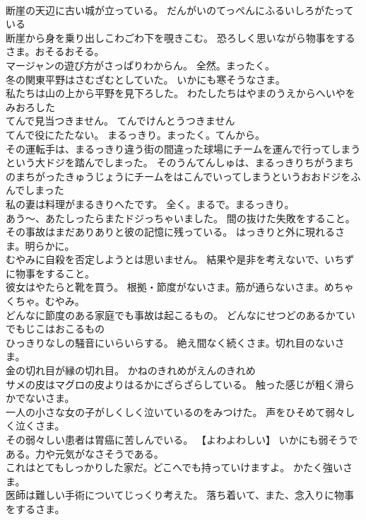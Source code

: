 \documentclass[8pt]{extreport}
\begin{document}
\begin{CJK}{UTF8}{min}
\\	断崖の天辺に古い城が立っている。	だんがいのてっぺんにふるいしろがたっている 
\\	断崖から身を乗り出しこわごわ下を覗きこむ。	恐ろしく思いながら物事をするさま。おそるおそる。
\\	マージャンの遊び方がさっぱりわからん。	全然。まったく。
\\	冬の関東平野はさむざむとしていた。	いかにも寒そうなさま。
\\	私たちは山の上から平野を見下ろした。	わたしたちはやまのうえからへいやをみおろした 
\\	てんで見当つきません。	てんでけんとうつきません 
\\	てんで役にたたない。	まるっきり。まったく。てんから。
\\	その運転手は、まるっきり違う街の間違った球場にチームを運んで行ってしまうという大ドジを踏んでしまった。	そのうんてんしゅは、まるっきりちがうまちのまちがったきゅうじょうにチームをはこんでいってしまうというおおドジをふんでしまった 
\\	私の妻は料理がまるきりへたです。	全く。まるで。まるっきり。
\\	あう～、あたしったらまたドジっちゃいました。	間の抜けた失敗をすること。
\\	その事故はまだありありと彼の記憶に残っている。	はっきりと外に現れるさま。明らかに。
\\	むやみに自殺を否定しようとは思いません。	結果や是非を考えないで、いちずに物事をすること。
\\	彼女はやたらと靴を買う。	根拠・節度がないさま。筋が通らないさま。めちゃくちゃ。むやみ。
\\	どんなに節度のある家庭でも事故は起こるもの。	どんなにせつどのあるかていでもじこはおこるもの 
\\	ひっきりなしの騒音にいらいらする。	絶え間なく続くさま。切れ目のないさま。
\\	金の切れ目が縁の切れ目。	かねのきれめがえんのきれめ 
\\	サメの皮はマグロの皮よりはるかにざらざらしている。	触った感じが粗く滑らかでないさま。
\\	一人の小さな女の子がしくしく泣いているのをみつけた。	声をひそめて弱々しく泣くさま。
\\	その弱々しい患者は胃癌に苦しんでいる。	【よわよわしい】 いかにも弱そうである。力や元気がなさそうである。
\\	これはとてもしっかりした家だ。どこへでも持っていけますよ。	かたく強いさま。
\\	医師は難しい手術についてじっくり考えた。	落ち着いて、また、念入りに物事をするさま。

\end{CJK}
\end{document}
